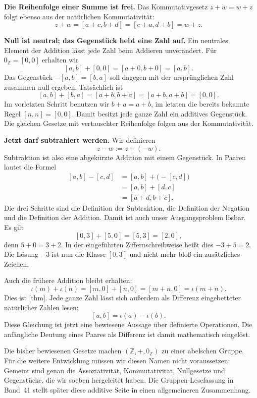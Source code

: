 \medskip\noindent\textbf{Die Reihenfolge einer Summe ist frei.}
Das Kommutativgesetz \(z+w=w+z\) folgt ebenso aus der
natürlichen Kommutativität:
\[
  z+w=[a+c,b+d]=[c+a,d+b]=w+z.
\]

\medskip\noindent\textbf{Null ist neutral; das Gegenstück hebt eine Zahl auf.}
Ein neutrales Element der Addition lässt jede Zahl beim Addieren
unverändert. Für \(0_{\mathbb Z}=[0,0]\) erhalten wir
\[
  [a,b]+[0,0]=[a+0,b+0]=[a,b].
\]
Das Gegenstück \(-[a,b]=[b,a]\) soll dagegen mit der ursprünglichen
Zahl zusammen null ergeben. Tatsächlich ist
\[
  [a,b]+[b,a]=[a+b,b+a]=[a+b,a+b]=[0,0].
\]
Im vorletzten Schritt benutzen wir \(b+a=a+b\), im letzten
die bereits bekannte Regel \([n,n]=[0,0]\).
Damit besitzt jede ganze Zahl ein additives Gegenstück. Die gleichen
Gesetze mit vertauschter Reihenfolge folgen aus der Kommutativität.

\medskip\noindent\textbf{Jetzt darf subtrahiert werden.}
Wir definieren
\[
  z-w:=z+(-w).
\]
Subtraktion ist also eine abgekürzte Addition mit einem Gegenstück.
In Paaren lautet die Formel
\[
  \begin{aligned}
    [a,b]-[c,d]
      &=[a,b]+\bigl(-[c,d]\bigr)\\
      &=[a,b]+[d,c]\\
      &=[a+d,b+c].
  \end{aligned}
\]
Die drei Schritte sind die Definition der Subtraktion, die
Definition der Negation und die Definition der Addition.
Damit ist auch unser Ausgangsproblem lösbar. Es gilt
\[
  [0,3]+[5,0]=[5,3]=[2,0],
\]
denn \(5+0=3+2\). In der eingeführten Ziffernschreibweise heißt
dies \(-3+5=2\). Die Lösung \(-3\) ist nun die Klasse \([0,3]\)
und nicht mehr bloß ein zusätzliches Zeichen.

Auch die frühere Addition bleibt erhalten:
\[
  \iota(m)+\iota(n)
    =[m,0]+[n,0]
    =[m+n,0]
    =\iota(m+n).
\]
Dies ist [thm].
Jede ganze Zahl lässt sich außerdem als Differenz eingebetteter
natürlicher Zahlen lesen:
\[
  [a,b]=\iota(a)-\iota(b).
\]
Diese Gleichung ist jetzt eine bewiesene Aussage über definierte
Operationen. Die anfängliche Deutung eines Paares als Differenz ist
damit mathematisch eingelöst.

Die bisher bewiesenen Gesetze machen \((\mathbb Z,+,0_{\mathbb Z})\)
zu einer abelschen Gruppe. Für die weitere Entwicklung müssen wir
diesen Namen nicht voraussetzen: Gemeint sind genau die
Assoziativität, Kommutativität, Nullgesetze und Gegenstücke, die wir
soeben hergeleitet haben. Die Gruppen-Lesefassung in Band~41 stellt
später diese additive Seite in einen allgemeineren Zusammenhang.

